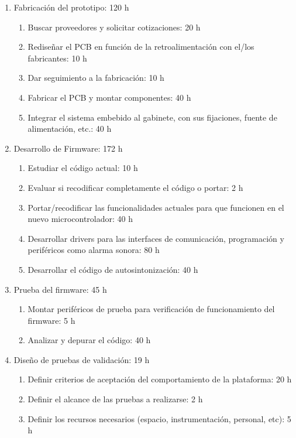 \documentclass[
11pt, %
]{charter}
\begin{document}
\begin{enumerate}
\item Fabricación del prototipo: 120 h
	\begin{enumerate}
	\item Buscar proveedores y solicitar cotizaciones: 20 h
	\item Rediseñar el PCB en función de la retroalimentación con el/los fabricantes: 10 h
	\item Dar seguimiento a la fabricación: 10 h
	\item Fabricar el PCB y montar componentes: 40 h
	\item Integrar el sistema embebido al gabinete, con sus fijaciones, fuente de alimentación, etc.: 40 h
    \end{enumerate}
    
\item Desarrollo de Firmware: 172 h
	\begin{enumerate}
	\item Estudiar el código actual: 10 h
	\item Evaluar si recodificar completamente el código o portar: 2 h
	\item Portar/recodificar las funcionalidades actuales para que funcionen en el nuevo microcontrolador: 40 h
	\item Desarrollar drivers para las interfaces de comunicación, programación y periféricos como alarma sonora: 80 h
	\item Desarrollar el código de autosintonización: 40 h
	\end{enumerate}

\item Prueba del firmware: 45 h
    \begin{enumerate}
    \item Montar periféricos de prueba para verificación de funcionamiento del firmware: 5 h
    \item Analizar y depurar el código: 40 h
    \end{enumerate}

\item Diseño de pruebas de validación: 19 h
    \begin{enumerate}
    \item Definir criterios de aceptación del comportamiento de la plataforma: 20 h
    \item Definir el alcance de las pruebas a realizarse: 2 h
    \item Definir los recursos necesarios (espacio, instrumentación, personal, etc): 5 h
    

\end{enumerate}
\end{enumerate}
\end{document}
